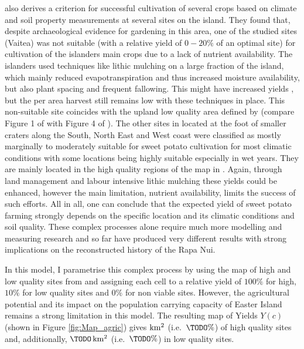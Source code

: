 \citet{Louwaried2006} also derives a criterion for successful cultivation of several crops based on climate and soil property measurements at several sites on the island. 
They found that, despite archaeological evidence for gardening in this area, one of the studied sites (Vaitea) was not suitable (with a relative yield of $0-20\%$ of an optimal site) for cultivation of the islanders main crops due to a lack of nutrient availability.
The islanders used techniques like lithic mulching on a large fraction of the island, which mainly reduced evapotranspiration and thus increased moisture availability, but also plant spacing and frequent fallowing.
This might have increased yields \citep{Louwarie2006}, but the per area harvest still remains low with these techniques in place.
This non-suitable site coincides with the upland low quality area defined by \citet{Puleston2017} (compare Figure 1 of \citet{Louwagie2006} with Figure 4 of \citet{Puleston2017}). 
The other sites in \citet{Louwaried2006} located at the foot of smaller craters along the South, North East and West coast were classified as mostly marginally to moderately suitable for sweet potato cultivation for most climatic conditions with some locations being highly suitable especially in wet years. 
They are mainly located in the high quality regions of the map in \citet{Pulestion2017}.
Again, through land management and labour intensive lithic mulching these yields could be enhanced, however the main limitation, nutrient availability, limits the success of such efforts. 
All in all, one can conclude that the expected yield of sweet potato farming strongly depends on the specific location and its climatic conditions and soil quality.
These complex processes alone require much more modelling and measuring research and so far have produced very different results with strong implications on the reconstructed history of the Rapa Nui.

In this model, I parametrise this complex process by using the map of high and low quality sites from \citet{Puleston2017} and assigning each cell to a relative yield of $100\%$ for high, $10\%$ for low quality sites and $0\%$ for non viable sites. 
However, the agricultural potential and its impact on the population carrying capacity of Easter Island remains a strong limitation in this model. %
The resulting map of Yields $Y(c)$ (shown in Figure \ref{fig:Map_agric}) gives \TODO $\rm{km^2}$ (i.e.\ $\TODO\%$) of high quality sites and, additionally, $\TODO\, \rm{km^2}$ (i.e.\ $\TODO\%$) in low quality sites.

